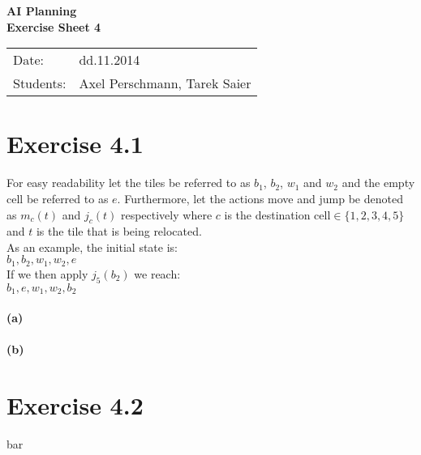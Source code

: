 \documentclass[11pt,a4paper]{article}
\begin{document}
\begin{center}
\Huge{\textbf{AI Planning}}\\
\LARGE{\textbf{Exercise Sheet 4}}
\end{center}
\vspace{2cm}
\begin{tabular}{ll}
Date: & dd.11.2014\\
Students: & Axel Perschmann, Tarek Saier
\end{tabular}

\section*{Exercise 4.1}
For easy readability let the tiles be referred to as $b_1$, $b_2$, $w_1$ and $w_2$ and the empty cell be referred to as $e$. Furthermore, let the actions move and jump be denoted as $m_c(t)$ and $j_c(t)$ respectively where $c$ is the destination cell$\in \{1,2,3,4,5\}$ and $t$ is the tile that is being relocated.\\
As an example, the initial state is:\\
$b_1,b_2,w_1,w_2,e$\\
If we then apply $j_5(b_2)$ we reach:\\
$b_1,e,w_1,w_2,b_2$\\
\\
\textbf{(a)}\\
\\
\textbf{(b)}

\section*{Exercise 4.2}
bar
\end{document}
